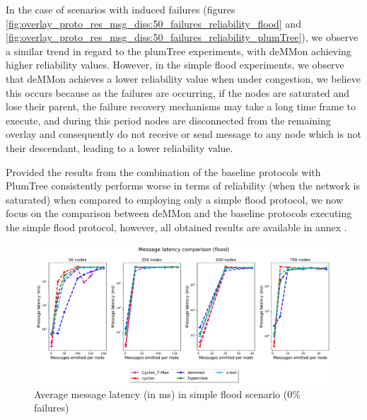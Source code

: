 In the case of scenarios with induced failures (figures \ref{fig:overlay_proto_res_msg_diss:50_failures_reliability_flood} and \ref{fig:overlay_proto_res_msg_diss:50_failures_reliability_plumTree}), we observe a similar trend in regard to the plumTree experiments, with deMMon achieving higher reliability values. However, in the simple flood experiments, we observe that deMMon achieves a lower reliability value when under congestion, we believe this occurs because as the failures are occurring, if the nodes are saturated and lose their parent, the failure recovery mechanisms may take a long time frame to execute, and during this period nodes are disconnected from the remaining overlay and consequently do not receive or send message to any node which is not their descendant, leading to a lower reliability value.

Provided the results from the combination of the baseline protocols with PlumTree consistently performs worse in terms of reliability (when the network is saturated) when compared to employing only a simple flood protocol, we now focus on the comparison between deMMon and the baseline protocols executing the simple flood protocol, however, all obtained results are available in annex .

\begin{figure}[htbp]
    \centering
    \includegraphics[width=\linewidth]{Chapters/evaluation/figures/flood/flood_0.0_failures_msg_lat.pdf}
    \caption{Average message latency (in ms) in simple flood scenario (0\% failures)}
    \label{fig:overlay_proto_res_msg_diss:0_failures_latency_flood}
\end{figure}

